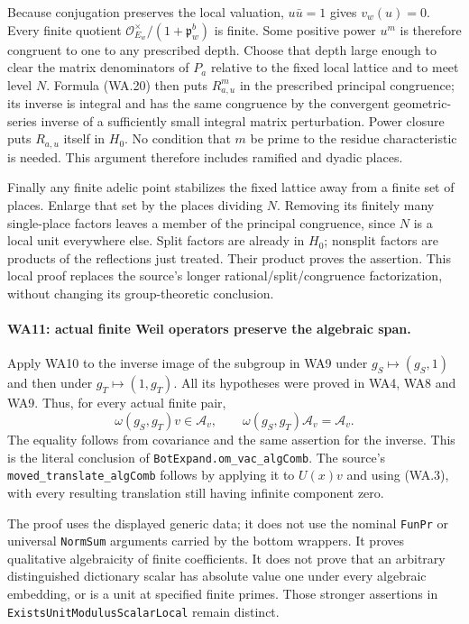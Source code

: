 Because conjugation preserves the local valuation,
$u\bar u=1$ gives $v_w(u)=0$.  Every finite quotient
$\mathcal O_{E_w}^{\times}/(1+\mathfrak p_w^b)$ is finite.
Some positive power $u^m$ is therefore congruent to one to any
prescribed depth.  Choose that depth large enough to clear the
matrix denominators of $P_a$ relative to the fixed local lattice
and to meet level $N$.  Formula (WA.20) then puts $R_{a,u}^m$
in the prescribed principal congruence; its inverse is integral
and has the same congruence by the convergent geometric-series
inverse of a sufficiently small integral matrix perturbation.
Power closure puts $R_{a,u}$ itself in $H_0$.  No condition that
$m$ be prime to the residue characteristic is needed.  This
argument therefore includes ramified and dyadic places.

Finally any finite adelic point stabilizes the fixed lattice
away from a finite set of places.  Enlarge that set by the places
dividing $N$.  Removing its finitely many single-place factors
leaves a member of the principal congruence, since $N$ is a
local unit everywhere else.  Split factors are already in
$H_0$; nonsplit factors are products of the reflections just
treated.  Their product proves the assertion.  This local proof
replaces the source's longer rational/split/congruence
factorization, without changing its group-theoretic conclusion.

\paragraph{WA11: actual finite Weil operators preserve the algebraic span.}
Apply WA10 to the inverse image of the subgroup in WA9 under
$g_S\mapsto(g_S,1)$ and then under $g_T\mapsto(1,g_T)$.
All its hypotheses were proved in WA4, WA8 and WA9.  Thus, for
every actual finite pair,
\[
     \omega(g_S,g_T)v\in\mathcal A_v,
          \qquad \omega(g_S,g_T)\mathcal A_v=\mathcal A_v.   \tag{WA.21}
\]
The equality follows from covariance and the same assertion for
the inverse.  This is the literal conclusion of
\texttt{BotExpand.om\_vac\_algComb}.  The source's
\texttt{moved\_translate\_algComb} follows by applying it to
$U(x)v$ and using (WA.3), with every resulting translation still
having infinite component zero.

The proof uses the displayed generic data; it does not use the
nominal \texttt{FunPr} or universal \texttt{NormSum} arguments
carried by the bottom wrappers.  It proves qualitative
algebraicity of finite coefficients.  It does not prove that an
arbitrary distinguished dictionary scalar has absolute value
one under every algebraic embedding, or is a unit at specified
finite primes.  Those stronger assertions in
\texttt{ExistsUnitModulusScalarLocal} remain distinct.

